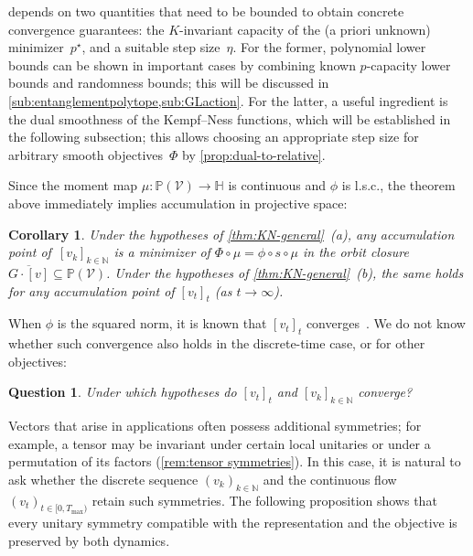 \documentclass[11pt,letterpaper]{article}
\newtheorem{corollary}[theorem]{Corollary}\AddToHook{env/corollary/begin}{\crefalias{theorem}{corollary}}
\newtheorem{question}[theorem]{Question}\AddToHook{env/question/begin}{\crefalias{theorem}{question}}
\numberwithin{equation}{section}
\newcommand{\NN}{\mathbb{N}}
\newcommand{\bbH}{\mathbb{H}}
\newcommand{\bbP}{\mathbb{P}}
\newcommand{\VV}{\mathcal{V}}
\begin{document}
 depends on two quantities that need to be bounded to obtain concrete convergence guarantees:
the $K$-invariant capacity of the (a priori unknown) minimizer~$p^\star$, and a suitable step size~$\eta$.
For the former, polynomial lower bounds can be shown in important cases by combining known $p$-capacity lower bounds and randomness bounds;
this will be discussed in \cref{sub:entanglementpolytope,sub:GLaction}.
For the latter, a useful ingredient is the dual smoothness of the Kempf--Ness functions, which will be established in the following subsection; this allows choosing an appropriate step size for arbitrary smooth objectives~$\Phi$ by \cref{prop:dual-to-relative}.

Since the moment map $\mu \colon \bbP(\VV) \to \bbH$ is continuous and $\phi$ is l.s.c., the theorem above immediately implies accumulation in projective space:

\begin{corollary}
Under the hypotheses of \cref{thm:KN-general}~(a), any accumulation point of~$[v_k]_{k \in \NN}$ is a minimizer of $\Phi\circ\mu = \phi\circ s\circ\mu$ in the orbit closure~$\overline{G\cdot[v]} \subseteq \bbP(\VV)$.
Under the hypotheses of \cref{thm:KN-general}~(b), the same holds for any accumulation point of $[v_t]_t$ (as $t\to\infty$).
\end{corollary}

\noindent
When $\phi$ is the squared norm, it is known that $[v_t]_t$ converges~\cite[Theorem~3.3]{GRS_Book}.
We do not know whether such convergence also holds in the discrete-time case, or for other objectives:

\begin{question}
    Under which hypotheses do $[v_t]_t$ and $[v_k]_{k \in \NN}$ converge?
\end{question}

Vectors that arise in applications often possess additional symmetries; for example, a tensor may be invariant under certain local unitaries or under a permutation of its factors (\cref{rem:tensor symmetries}).
In this case, it is natural to ask whether the discrete sequence $(v_k)_{k\in\NN}$ and the continuous flow $(v_t)_{t\in[0,T_{\max}) }$ retain such symmetries.
The following proposition shows that every unitary symmetry compatible with the representation and the objective is preserved by both dynamics.
\end{document}
